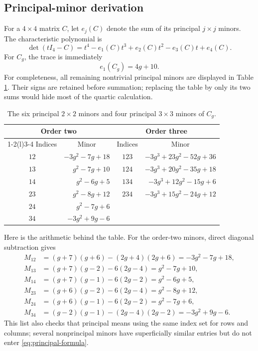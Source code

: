 \documentclass[11pt]{article}
\theoremstyle{remark}
\numberwithin{equation}{section}
\begin{document}
\subsection{Principal-minor derivation}

For a \(4\times4\) matrix \(C\), let \(e_j(C)\) denote the sum of its
principal \(j\times j\) minors.  The characteristic polynomial is
\begin{equation}\label{eq:principal-formula}
\det(tI_4-C)
=t^4-e_1(C)t^3+e_2(C)t^2-e_3(C)t+e_4(C).
\end{equation}
For \(C_g\), the trace is immediately
\begin{equation}\label{eq:e1}
e_1(C_g)=4g+10.
\end{equation}
For completeness, all remaining nontrivial principal minors are displayed
in Table \ref{tab:minors}.  Their signs are retained before summation;
replacing the table by only its two sums would hide most of the quartic
calculation.

\begin{table}[t]
\centering
\caption{The six principal \(2\times2\) minors and four principal
\(3\times3\) minors of \(C_g\).}
\label{tab:minors}
\begin{tabular}{@{}c r@{\qquad\qquad}c r@{}}
\toprule
\multicolumn{2}{c}{Order two} & \multicolumn{2}{c}{Order three}\\
\cmidrule(r){1-2}\cmidrule(l){3-4}
Indices & \multicolumn{1}{c}{Minor} & Indices & \multicolumn{1}{c}{Minor}\\
\midrule
\(12\) & \(-3g^2-7g+18\) &
\(123\) & \(-3g^3+23g^2-52g+36\)\\
\(13\) & \(g^2-7g+10\) &
\(124\) & \(-3g^3+20g^2-35g+18\)\\
\(14\) & \(g^2-6g+5\) &
\(134\) & \(-3g^3+12g^2-15g+6\)\\
\(23\) & \(g^2-8g+12\) &
\(234\) & \(-3g^3+15g^2-24g+12\)\\
\(24\) & \(g^2-7g+6\) & & \\
\(34\) & \(-3g^2+9g-6\) & & \\
\bottomrule
\end{tabular}
\end{table}

Here is the arithmetic behind the table.  For the order-two minors, direct
diagonal subtraction gives
\begin{equation}\label{eq:two-minor-expansions}
\begin{aligned}
M_{12}
&=(g+7)(g+6)-(2g+4)(2g+6)
=-3g^2-7g+18,\\
M_{13}
&=(g+7)(g-2)-6(2g-4)
=g^2-7g+10,\\
M_{14}
&=(g+7)(g-1)-6(2g-2)
=g^2-6g+5,\\
M_{23}
&=(g+6)(g-2)-6(2g-4)
=g^2-8g+12,\\
M_{24}
&=(g+6)(g-1)-6(2g-2)
=g^2-7g+6,\\
M_{34}
&=(g-2)(g-1)-(2g-4)(2g-2)
=-3g^2+9g-6.
\end{aligned}
\end{equation}
This list also checks that principal means using the same index set for
rows and columns; several nonprincipal minors have superficially similar
entries but do not enter \eqref{eq:principal-formula}.
\end{document}
